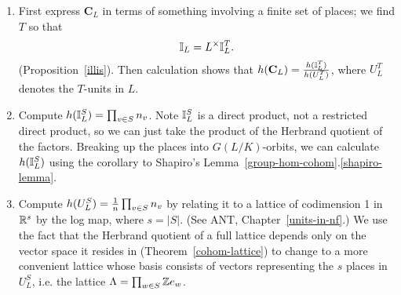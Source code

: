 \begin{enumerate}
\item
First express $\mathbf C_L$ in terms of something involving a finite set of places; we find $T$ so that
\[
\mathbb{I}_L=L^{\times}\mathbb{I}_L^T.
\]
(Proposition~\ref{illis}). Then calculation shows that $h(\mathbf C_L)=\frac{h(\mathbb{I}_L^T)}{h(U_L^T)}$, where $U_L^T$ denotes the $T$-units in $L$.
\item Compute $h(\mathbb{I}_L^S)=\prod_{v\in S}n_v$. Note $\mathbb{I}_L^S$ is a direct product, not a restricted direct product, so we can just take the product of the Herbrand quotient of the factors. Breaking up the places into $G(L/K)$-orbits, we can calculate $h(\mathbb{I}_L^S)$ using the corollary to Shapiro's Lemma~\ref{group-hom-cohom}.\ref{shapiro-lemma}.
\item Compute $h(U_L^S)=\frac{1}{n}\prod_{v\in S}n_v$ by relating it to a lattice of codimension 1 in $\mathbb{R}^s$ by the log map, where $s=|S|$. (See ANT, Chapter~\ref{units-in-nf}.)
We use the fact that the Herbrand quotient of a full lattice depends only on the vector space it resides in (Theorem~\ref{cohom-lattice}) to change to a more convenient lattice whose basis consists of vectors representing the $s$ places in $U_L^S$, i.e. the lattice $\Lambda=\prod_{w\in S} \mathbb{Z} e_w$. 


\end{enumerate}
